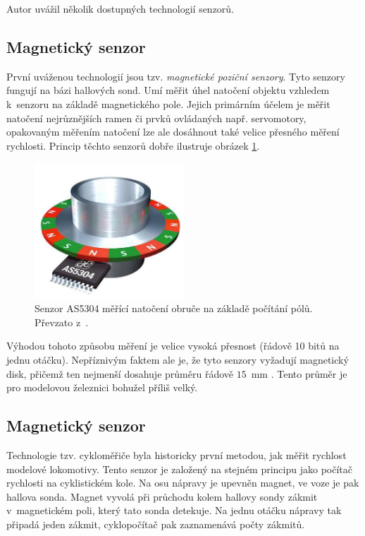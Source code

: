 Autor uvážil několik dostupných technologií senzorů.

\subsection{Magnetický senzor}
\label{subsec:wsm-senzor-mag}

První uváženou technologií jsou tzv. \textit{magnetické poziční senzory}.
Tyto senzory fungují na bázi hallových sond. Umí měřit úhel natočení objektu
vzhledem k~senzoru na základě magnetického pole. Jejich primárním účelem je
měřit natočení nejrůznějších ramen či prvků ovládaných např. servomotory,
opakovaným měřením natočení lze ale dosáhnout také velice přesného měření
rychlosti. Princip těchto senzorů dobře ilustruje obrázek
\ref{fig:magnetic-sensor}.

\begin{figure}[ht]
\includegraphics[width=0.5\textwidth]{data/magnetic_sensor.png}
\caption{Senzor AS5304 měřící natočení obruče na základě počítání pólů. Převzato
z~\cite{as5306}.}
\label{fig:magnetic-sensor}
\end{figure}

Výhodou tohoto způsobu měření je velice vysoká přesnost (řádově 10 bitů na
jednu otáčku). Nepříznivým faktem ale je, že tyto senzory vyžadují magnetický
disk, přičemž ten nejmenší dosahuje průměru řádově $15$~mm \cite{magnets}.
Tento průměr je pro modelovou železnici bohužel příliš velký.

\subsection{Magnetický senzor }
\label{subsec:wsm-senzor-cyclo}

Technologie tzv. cykloměřiče byla historicky první metodou, jak měřit
rychlost modelové lokomotivy. Tento senzor je založený na stejném principu jako
počítač rychlosti na cyklistickém kole. Na osu nápravy je upevněn magnet, ve
voze je pak hallova sonda. Magnet vyvolá při průchodu kolem hallovy sondy
zákmit v~magnetickém poli, který tato sonda detekuje. Na jednu otáčku nápravy
tak připadá jeden zákmit, cyklopočítač pak zaznamenává počty zákmitů.

